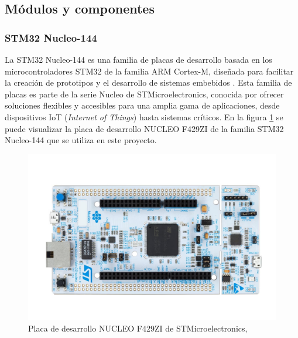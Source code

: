 
\subsection{Módulos y componentes}
\subsubsection{STM32 Nucleo-144}


La STM32 Nucleo-144 es una familia de placas de desarrollo basada en los microcontroladores STM32 de la familia ARM Cortex-M, diseñada para facilitar la creación de prototipos y el desarrollo de sistemas embebidos \cite{nucleo144}. Esta familia de placas es parte de la serie Nucleo de STMicroelectronics, conocida por ofrecer soluciones flexibles y accesibles para una amplia gama de aplicaciones, desde dispositivos IoT (\textit{Internet of Things}) hasta sistemas críticos. En la figura \ref{fig:nucleo144} se puede visualizar la placa de desarrollo NUCLEO F429ZI de la familia STM32 Nucleo-144 que se utiliza en este proyecto.\\


\begin{figure}[H]
    \centering
    \includegraphics[height=\linewidth, angle=90]{img/nucleo144.jpeg}
    \caption{Placa de desarrollo NUCLEO F429ZI de STMicroelectronics,}
    \label{fig:nucleo144}
\end{figure}



